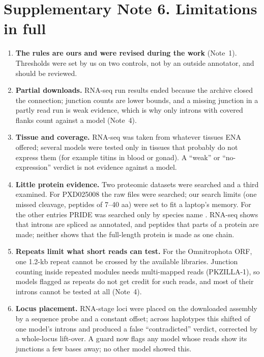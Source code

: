 \documentclass[11pt]{article}
\begin{document}
\FloatBarrier
\section*{Supplementary Note 6. Limitations in full}
\begin{enumerate}[leftmargin=*]
\item \textbf{The rules are ours and were revised during the work} (Note~1). Thresholds were set by us on two controls, not
by an outside annotator, and should be reviewed.
\item \textbf{Partial downloads.}  RNA-seq run results ended because the archive closed the
connection; junction counts are lower bounds, and a missing junction in a partly read run is weak evidence, which is why
only introns with covered flanks count against a model (Note~4).
\item \textbf{Tissue and coverage.} RNA-seq was taken from whatever tissues ENA offered; several models were tested only in
tissues that probably do not express them (for example titins in blood or gonad). A ``weak'' or ``no-expression'' verdict
is not evidence against a model.
\item \textbf{Little protein evidence.} Two proteomic datasets were searched and a third examined. For PXD025008 the raw
files were searched; our search limits (one missed cleavage, peptides of 7--40 aa) were set to fit a laptop's memory. For
the other entries PRIDE was searched only by species name \citep{perezriverol2025}. RNA-seq shows that introns are spliced
as annotated, and peptides that parts of a protein are made; neither shows that the full-length protein is made as one
chain.
\item \textbf{Repeats limit what short reads can test.} For the Omnitrophota ORF, one 1.2-kb repeat cannot be crossed by
the available libraries. Junction counting inside repeated modules needs multi-mapped reads (PKZILLA-1), so models flagged
as repeats do not get credit for such reads, and most of their introns cannot be tested at all (Note~4).
\item \textbf{Locus placement.} RNA-stage loci were placed on the downloaded assembly by a sequence probe and a constant
offset; across haplotypes this shifted  of one model's  introns and produced a
false ``contradicted'' verdict, corrected by a whole-locus lift-over. A guard now flags any model whose reads show its
junctions a few bases away; no other model showed this.

\end{enumerate}
\end{document}
